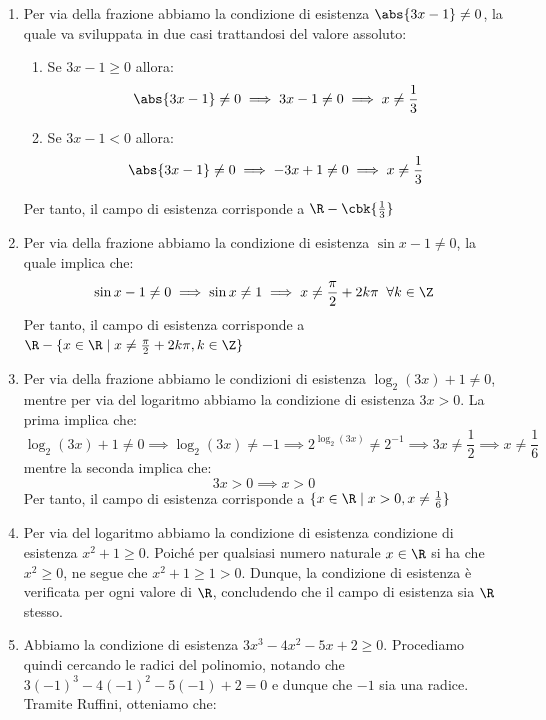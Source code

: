 \documentclass[a4paper, 12pt]{report}
\begin{document}
    \begin{enumerate}
        \item Per via della frazione abbiamo la condizione di esistenza $\abs{3x-1} \neq 0$, la quale va sviluppata in due casi trattandosi del valore assoluto:
        \begin{enumerate}
            \item Se $3x-1 \geq 0$ allora:
            \[\abs{3x-1} \neq 0 \implies 3x-1 \neq 0 \implies x \neq \frac{1}{3}\]
            \item Se $3x-1 < 0$ allora:
            \[\abs{3x-1} \neq 0 \implies -3x+1 \neq 0 \implies x \neq \frac{1}{3}\]
        \end{enumerate}

        Per tanto, il campo di esistenza corrisponde a $\R - \cbk{\frac{1}{3}}$

        \item Per via della frazione abbiamo la condizione di esistenza $\sin x -1 \neq 0$, la quale implica che:
        \[\sin x -1 \neq 0 \implies \sin x \neq 1 \implies x \neq \frac{\pi}{2} + 2k\pi \;\; \forall k \in \Z\]
        Per tanto, il campo di esistenza corrisponde a $\R - \{x \in \R \mid x \neq \frac{\pi}{2} + 2k\pi, k \in \Z\}$

        \item Per via della frazione abbiamo le condizioni di esistenza $\log_2(3x) +1 \neq 0$, mentre per via del logaritmo abbiamo la condizione di esistenza $3x > 0$. La prima implica che:
        \[\log_2(3x) +1 \neq 0 \implies \log_2(3x) \neq -1 \implies 2^{\log_2(3x)} \neq 2^{-1} \implies 3x \neq \frac{1}{2} \implies x \neq \frac{1}{6}\]
        mentre la seconda implica che:
        \[3x > 0 \implies x > 0\]
        Per tanto, il campo di esistenza corrisponde a $\{x \in \R \mid x > 0, x \neq \frac{1}{6}\}$

        \item Per via del logaritmo abbiamo la condizione di esistenza condizione di esistenza $x^2+1 \geq 0$. Poiché per qualsiasi numero naturale $x \in \R$ si ha che $x^2 \geq 0$, ne segue che $x^2+1 \geq 1 > 0$. Dunque, la condizione di esistenza è verificata per ogni valore di $\R$, concludendo che il campo di esistenza sia $\R$ stesso.
        
        \item Abbiamo la condizione di esistenza $3 x^3 - 4 x^2 - 5 x + 2 \geq 0$. Procediamo quindi cercando le radici del polinomio, notando che $3(-1)^3-4(-1)^2-5(-1)+2 = 0$ e dunque che $-1$ sia una radice. Tramite Ruffini, otteniamo che:
        

\end{enumerate}
\end{document}
